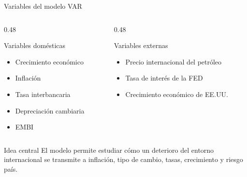 \begin{frame}{Variables del modelo VAR}

\begin{columns}[T]

\begin{column}{0.48\textwidth}
\begin{block}{Variables domésticas}
\small
\begin{itemize}
    \item Crecimiento económico
    \item Inflación
    \item Tasa interbancaria
    \item Depreciación cambiaria
    \item EMBI
\end{itemize}
\end{block}
\end{column}

\begin{column}{0.48\textwidth}
\begin{block}{Variables externas}
\small
\begin{itemize}
    \item Precio internacional del petróleo
    \item Tasa de interés de la FED
    \item Crecimiento económico de EE.UU.
\end{itemize}
\end{block}
\end{column}

\end{columns}

\vspace{0.5em}

\begin{alertblock}{Idea central}
El modelo permite estudiar cómo un deterioro del entorno internacional se transmite a inflación, tipo de cambio, tasas, crecimiento y riesgo país.
\end{alertblock}

\end{frame}

